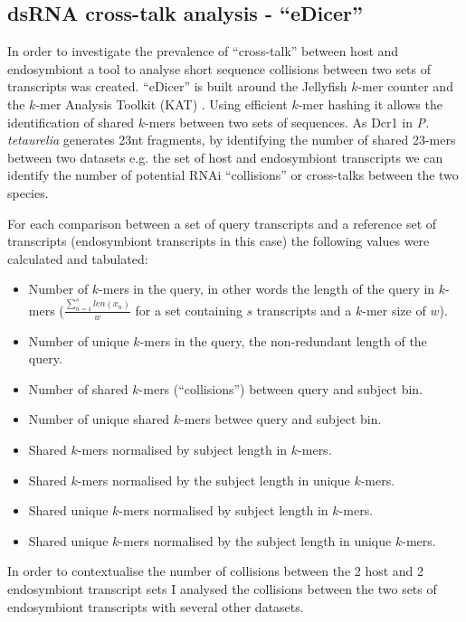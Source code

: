 \subsection{dsRNA cross-talk analysis - ``eDicer''}

In order to investigate the prevalence of ``cross-talk'' between 
host and endosymbiont a tool to analyse short sequence collisions between two sets
of transcripts was created.  ``eDicer'' is built around 
the Jellyfish \(k\)-mer counter \citep{Marcais2011} 
and the \(k\)-mer Analysis Toolkit (KAT) \citep{ClavijoKAT}.  Using efficient
\(k\)-mer hashing it allows the identification of shared \(k\)-mers between
two sets of sequences.  As Dcr1 in \textit{P. tetaurelia} generates
23nt fragments, by identifying the number of shared 23-mers between
two datasets e.g. the set of host and endosymbiont transcripts 
we can identify the number of potential RNAi ``collisions'' or cross-talks
between the two species. 

For each comparison between a set of query transcripts and a reference
set of transcripts (endosymbiont transcripts in this case)
the following
values were calculated and tabulated:
\begin{itemize}
    \item Number of \(k\)-mers in the query, in other words the length of the query
        in \(k\)-mers (\(\frac{\sum^s_{n=1} len(x_{n})}{w}\)
        for a set containing \(s\) transcripts and a \(k\)-mer size of \(w\)).
    \item Number of unique \(k\)-mers in the query, the non-redundant length of 
        the query.
    \item Number of shared  \(k\)-mers (``collisions'') between query and subject bin.
    \item Number of unique shared \(k\)-mers betwee query and subject bin.
    \item Shared \(k\)-mers normalised by subject length in \(k\)-mers.
    \item Shared \(k\)-mers normalised by the subject length in unique \(k\)-mers.
    \item Shared unique \(k\)-mers normalised by subject length in \(k\)-mers.
    \item Shared unique \(k\)-mers normalised by the subject length in unique \(k\)-mers.
\end{itemize}

In order to contextualise the number of collisions between the 2
host and 2 endosymbiont transcript sets
I analysed the collisions between the two sets of endosymbiont transcripts 
with several other datasets.  


